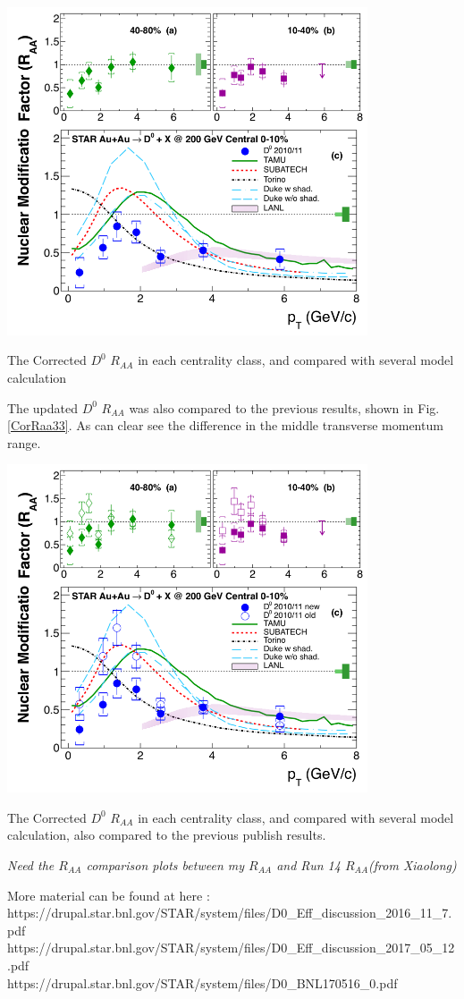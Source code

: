 \bfg \centering
\includegraphics[width=0.8\textwidth]{figure/Run11_YF/fig3.png}
\caption{The Corrected $D^0$ $R_{AA}$ in each centrality class, and compared with several model calculation }
\label{CorRaa}
\efg

The updated $D^0$ $R_{AA}$ was also compared to the previous results, shown in Fig.\ref{CorRaa33}. As can clear see the difference in the middle transverse momentum range.

\bfg \centering
\includegraphics[width=0.8\textwidth]{figure/Run11_YF/fig33.png}
\caption{The Corrected $D^0$ $R_{AA}$ in each centrality class, and compared with several model calculation, also compared to the previous publish results.}
\label{CorRaa33}
\efg

\emph{Need the $R_{AA}$ comparison plots between my $R_{AA}$  and Run 14 $R_{AA}$(from Xiaolong) }

More material can be found at here :  
\\https://drupal.star.bnl.gov/STAR/system/files/D0\_Eff\_discussion\_2016\_11\_7.pdf
\\https://drupal.star.bnl.gov/STAR/system/files/D0\_Eff\_discussion\_2017\_05\_12.pdf
\\https://drupal.star.bnl.gov/STAR/system/files/D0\_BNL170516\_0.pdf
% 



